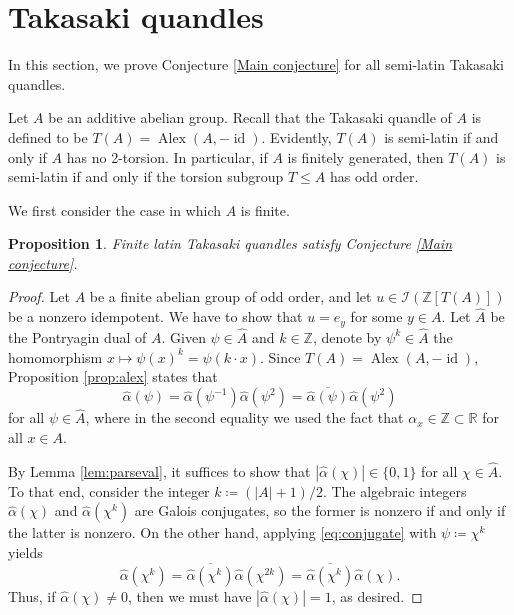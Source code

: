 \documentclass[12pt]{amsart}
\newtheorem{pro}[thm]{Proposition}
\theoremstyle{definition}
\theoremstyle{remark}
\newcommand{\Id}{\operatorname{id}}
\newcommand{\R}{\mathbb{R}}
\newcommand{\Z}{\mathbb{Z}}
\newcommand{\I}{\mathcal{I}}
\newcommand{\A}{\widehat{A}}
\newcommand{\Alpha}{\widehat{\alpha}}
\def\Alex{\operatorname{Alex}}
\begin{document}
\section{Takasaki quandles}\label{sec:takasaki}

In this section, we prove Conjecture \ref{Main conjecture} for all semi-latin Takasaki quandles.



Let $A$ be an additive abelian group. Recall that the Takasaki quandle of $A$ is defined to be $T(A)=\Alex(A,-\Id)$.  
Evidently, $T(A)$ is semi-latin if and only if $A$ has no 2-torsion. In particular, if $A$ is finitely generated, then $T(A)$ is semi-latin if and only if the torsion subgroup $T\leq A$ has odd order. 

We first consider the case in which $A$ is finite. 

\begin{pro}\label{pro:finite-takasaki}
    Finite latin Takasaki quandles satisfy Conjecture \ref{Main conjecture}.
\end{pro}

\begin{proof}
    Let $A$ be a finite abelian group of odd order, and let $u\in\I(\Z[T(A)])$ be a nonzero idempotent. We have to show that $u=e_y$ for some $y\in A$. Let $\A$ be the Pontryagin dual of $A$. Given $\psi\in\A$ and $k\in\Z$, denote by $\psi^k\in\A$ the homomorphism $x\mapsto \psi(x)^k=\psi(k\cdot x)$.
    Since $T(A)=\Alex(A,-\Id)$, Proposition \ref{prop:alex} states that 
    \begin{equation}\label{eq:conjugate}
        \Alpha (\psi)=\Alpha (\psi^{-1})\Alpha (\psi^2)=\overline{\Alpha (\psi)}\Alpha (\psi^2)
    \end{equation}
    for all $\psi\in\A$,
    where in the second equality we used the fact that $\alpha_x\in\Z\subset\R$ for all $x\in A$. 
    
    By Lemma \ref{lem:parseval}, it suffices to show that $|\Alpha (\chi)|\in\{0,1\}$ for all $\chi\in \A$. To that end, consider the integer $k\coloneq (|A|+1)/2$. The algebraic integers $\Alpha (\chi)$ and $\Alpha (\chi^k)$ are Galois conjugates, so the former is nonzero if and only if the latter is nonzero. On the other hand, applying \eqref{eq:conjugate} with $\psi\coloneq \chi^k$ yields
    \[
    \Alpha (\chi^k)=\overline{\Alpha (\chi^k)}\Alpha (\chi^{2k})=\overline{\Alpha (\chi^k)}\Alpha (\chi).
    \]
    Thus, if $\Alpha (\chi)\neq 0$, then we must have $|\Alpha (\chi)|=1$, as desired.
\end{proof}
\end{document}
